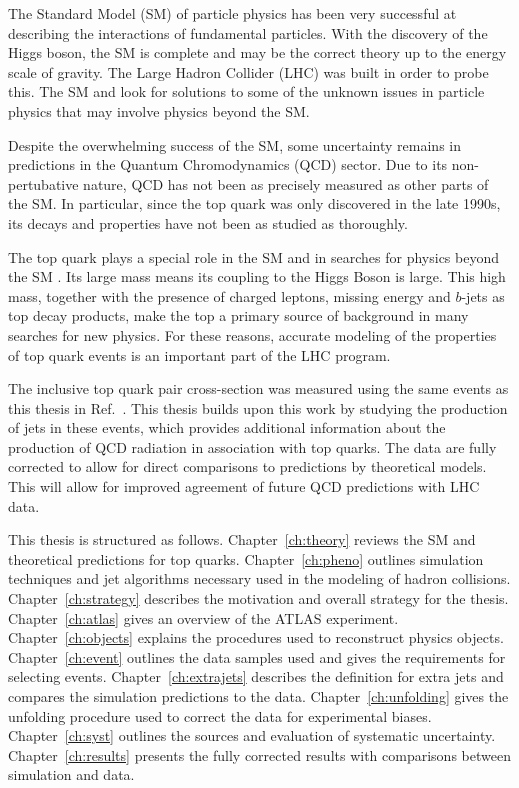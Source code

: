 The Standard Model (SM) of particle physics has been very successful at describing the interactions of fundamental particles. With the discovery of the Higgs boson, the SM is complete and may be the correct theory up to the energy scale of gravity. The Large Hadron Collider (LHC) was built in order to probe this. The SM and look for solutions to some of the unknown issues in particle physics that may involve physics beyond the SM.

Despite the overwhelming success of the SM, some uncertainty remains in predictions in the Quantum Chromodynamics (QCD) sector. Due to its non-pertubative nature, QCD has not been as precisely measured as other parts of the SM. In particular, since the top quark was only discovered in the late 1990s, its decays and properties have not been as studied as thoroughly. 

The top quark plays a special role in the SM and in searches for
physics beyond the SM .  Its large mass means its coupling to the
Higgs Boson is large.  This high mass, together with the presence of 
charged leptons, missing energy and $b$-jets as top decay products,
make the top a primary source of background in many searches for new physics.
For these reasons, accurate modeling of the properties of top quark
events is an important part of the LHC program.

The inclusive top quark pair cross-section was measured using the same events as this thesis in Ref.~\cite{xsec}. This thesis builds upon this work by studying the production of jets in these events, which provides additional information about the production of QCD radiation in association with top quarks. The data are fully corrected to allow for direct comparisons to predictions by theoretical models. This will allow for improved agreement of future QCD predictions with LHC data.

This thesis is structured as follows. Chapter~\ref{ch:theory} reviews the SM and theoretical predictions for top quarks. Chapter~\ref{ch:pheno} outlines simulation techniques and jet algorithms necessary used in the modeling of hadron collisions. Chapter~\ref{ch:strategy} describes the motivation and overall strategy for the thesis. Chapter~\ref{ch:atlas} gives an overview of the ATLAS experiment. Chapter~\ref{ch:objects} explains the procedures used to reconstruct physics objects. Chapter~\ref{ch:event} outlines the data samples used and gives the requirements for selecting events. Chapter~\ref{ch:extrajets} describes the definition for extra jets and compares the simulation predictions to the data. Chapter~\ref{ch:unfolding} gives the unfolding procedure used to correct the data for experimental biases. Chapter~\ref{ch:syst} outlines the sources and evaluation of systematic uncertainty. Chapter~\ref{ch:results} presents the fully corrected results with comparisons between simulation and data.
